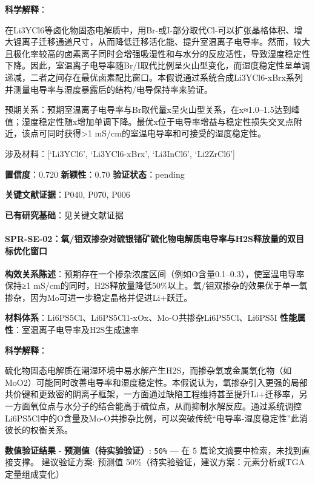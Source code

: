 \documentclass[12pt,a4paper]{ctexart}
\begin{document}
\textbf{科学解释}：

在Li3YCl6等卤化物固态电解质中，用Br-或I-部分取代Cl-可以扩张晶格体积、增大锂离子迁移通道尺寸，从而降低迁移活化能、提升室温离子电导率。然而，较大且极化率较高的卤素离子同时会增强吸湿性和与水分的反应活性，导致湿度稳定性下降。因此，室温离子电导率随Br/I取代比例呈火山型变化，而湿度稳定性呈单调递减，二者之间存在最优卤素配比窗口。本假说通过系统合成Li3YCl6-xBrx系列并测量电导率与湿度暴露后的结构/电导保持率来验证。

预期关系：预期室温离子电导率与Br取代量x呈火山型关系，在x≈1.0--1.5达到峰值；湿度稳定性随x增加单调下降。最优x位于电导率增益与稳定性损失交叉点附近，该点可同时获得\textgreater1 mS/cm的室温电导率和可接受的湿度稳定性。

涉及材料：{[}`Li3YCl6', `Li3YCl6-xBrx', `Li3InCl6', `Li2ZrCl6'{]}

\textbf{置信度}：0.720 \textbar{} \textbf{新颖性}：0.70 \textbar{} \textbf{验证状态}：pending

\textbf{关键文献证据}：P040, P070, P006

\textbf{已有研究基础}：见关键文献证据

\paragraph{SPR-SE-02：氧/钼双掺杂对硫银锗矿硫化物电解质电导率与H2S释放量的双目标优化窗口}\label{spr-se-02ux6c27ux94bcux53ccux63baux6742ux5bf9ux786bux94f6ux9517ux77ffux786bux5316ux7269ux7535ux89e3ux8d28ux7535ux5bfcux7387ux4e0eh2sux91caux653eux91cfux7684ux53ccux76eeux6807ux4f18ux5316ux7a97ux53e3}

\textbf{构效关系陈述}：预期存在一个掺杂浓度区间（例如O含量0.1--0.3），使室温电导率保持≥1 mS/cm的同时，H2S释放量降低50\%以上。氧/钼双掺杂的效果优于单一氧掺杂，因为Mo可进一步稳定晶格并促进Li+跃迁。

\textbf{材料体系}：Li6PS5Cl、Li6PS5Cl1-xOx、Mo-O共掺杂Li6PS5Cl、Li6PS5I \textbar{} \textbf{性能属性}：室温离子电导率及H2S生成速率

\textbf{科学解释}：

硫化物固态电解质在潮湿环境中易水解产生H2S，而掺杂氧或金属氧化物（如MoO2）可能同时改善电导率和湿度稳定性。本假说认为，氧掺杂引入更强的局部共价键和更致密的阴离子框架，一方面通过缺陷工程维持甚至提升Li+迁移率，另一方面氧位点与水分子的结合能高于硫位点，从而抑制水解反应。通过系统调控Li6PS5Cl中的O含量及Mo-O共掺杂比例，可以突破传统``电导率-湿度稳定性''此消彼长的权衡关系。

\textbf{数值验证结果} - \textbf{预测值（待实验验证）}: \texttt{50\%} --- 在 5 篇论文摘要中检索，未找到直接支撑。 建议验证方案: 预测值 50\%（待实验验证，建议方案：元素分析或TGA定量组成变化）
\end{document}
